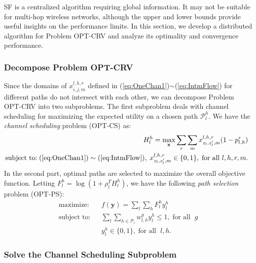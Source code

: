 \documentclass[12pt,onecolumn,draftclsnofoot]{IEEEtran} %
\begin{document}
SF is a centralized algorithm requiring global information.  It may not be suitable for multi-hop wireless networks, although the upper and lower bounds provide useful insights on the performance limits. In this section, we develop a distributed algorithm for Problem OPT-CRV and analyze its optimality and convergence performance. 


\subsubsection{Decompose Problem OPT-CRV}

Since the domains of $x_{i,j,m}^{l,h,r}$ defined in (\ref{eq:OneChan1})$\sim$(\ref{eq:IntmFlow}) for different paths do not intersect with each other, we can decompose Problem OPT-CRV into two subproblems.  The first subproblem deals with channel scheduling for maximizing the expected utility on a chosen path $\mathcal{P}_l^h$.  We have the {\em channel scheduling} problem (OPT-CS) as: 
\begin{eqnarray}
	&& \hspace{-0.2in} H_l^h=\max_{\mathbf{x}} \sum_r \sum_m
      x_{z_l,z'_l,m}^{l,h,r}(1-p_{l,h}^r)  \label{eq:optcs} \\
&& \hspace{-0.2in} \mbox{subject to:} \; (\ref{eq:OneChan1})\sim(\ref{eq:IntmFlow}), \; x_{z_l,z'_l,m}^{l,h,r} \in \{0,1\}, \; \mbox{for all } l, h, r, m. \nonumber
\end{eqnarray}
In the second part, optimal paths are selected to maximize the overall objective function.  Letting $F_l^h = \log \left( 1 + \rho_l^T H_l^h \right)$, we have the following {\em path selection} problem (OPT-PS):
\begin{eqnarray}
	\mbox{maximize:} && f(\mathbf{y}) = 
    \sum_l \sum_h F_l^h y_l^h  \label{eq:PathSelec} \\
	  \mbox{subject to:} && \sum_l\sum_{h 
	           \in \mathcal{P}_l} 
	  w_{l,h}^g y_l^h \le 1, \; \mbox{for all } \; g \nonumber \\
	  && y_l^h \in \{0,1\}, \; \mbox{for all } \; l, h. \nonumber
\end{eqnarray}


\subsubsection{Solve the Channel Scheduling Subproblem}
\end{document}
